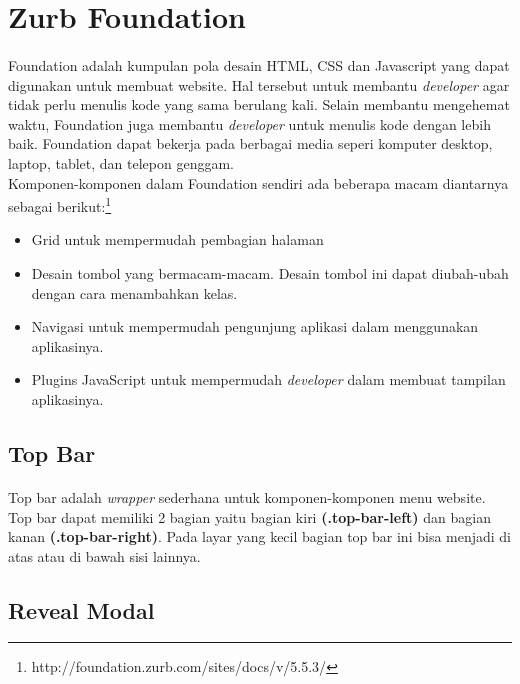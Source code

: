 \section{Zurb Foundation}
\label{zurbfoundation}

\paragraph{}  Foundation adalah kumpulan pola desain HTML, CSS dan Javascript yang dapat digunakan untuk membuat website. Hal tersebut untuk membantu \textit{developer} agar tidak perlu menulis kode yang sama berulang kali. Selain membantu mengehemat waktu, Foundation juga membantu \textit{developer} untuk menulis kode dengan lebih baik. Foundation dapat bekerja pada berbagai media seperi komputer desktop, laptop, tablet, dan telepon genggam.\cite{zurbfoundation:17} \\
Komponen-komponen dalam Foundation sendiri ada beberapa macam diantarnya sebagai berikut:\footnote{http://foundation.zurb.com/sites/docs/v/5.5.3/}

\begin{itemize}
	\item  Grid untuk mempermudah pembagian halaman
	\item  Desain tombol yang bermacam-macam. Desain tombol ini dapat diubah-ubah dengan cara menambahkan kelas.
	\item  Navigasi untuk mempermudah pengunjung aplikasi dalam menggunakan aplikasinya.
	\item  Plugins JavaScript untuk mempermudah \textit{developer} dalam membuat tampilan aplikasinya.
\end{itemize}

\subsection{Top Bar}
\paragraph{} Top bar adalah \textit{wrapper} sederhana untuk komponen-komponen menu website. Top bar dapat memiliki 2 bagian yaitu bagian kiri \textbf{(.top-bar-left)} dan bagian kanan \textbf{(.top-bar-right)}. Pada layar yang kecil bagian top bar ini bisa menjadi di atas atau di bawah sisi lainnya.

\subsection{Reveal Modal}
